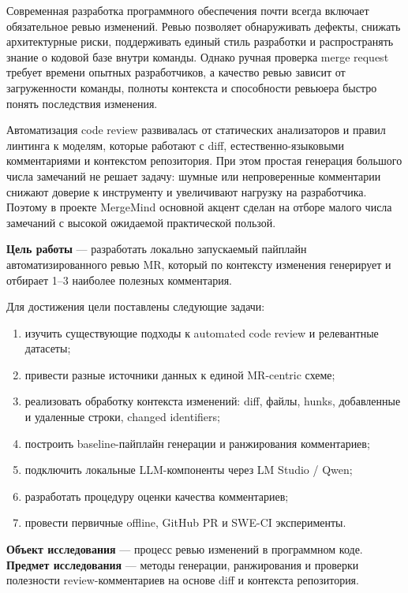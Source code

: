 \documentclass[14pt,a4paper]{extreport}
\begin{document}
Современная разработка программного обеспечения почти всегда включает
обязательное ревью изменений. Ревью позволяет обнаруживать дефекты, снижать
архитектурные риски, поддерживать единый стиль разработки и распространять
знание о кодовой базе внутри команды. Однако ручная проверка merge request
требует времени опытных разработчиков, а качество ревью зависит от загруженности
команды, полноты контекста и способности ревьюера быстро понять последствия
изменения.

Автоматизация code review развивалась от статических анализаторов и правил
линтинга к моделям, которые работают с diff, естественно-языковыми
комментариями и контекстом репозитория. При этом простая генерация большого
числа замечаний не решает задачу: шумные или непроверенные комментарии снижают
доверие к инструменту и увеличивают нагрузку на разработчика. Поэтому в проекте
MergeMind основной акцент сделан на отборе малого числа замечаний с высокой
ожидаемой практической пользой.

\textbf{Цель работы} --- разработать локально запускаемый пайплайн
автоматизированного ревью MR, который по контексту изменения генерирует и
отбирает 1--3 наиболее полезных комментария.

Для достижения цели поставлены следующие задачи:

\begin{enumerate}
  \item изучить существующие подходы к automated code review и релевантные
    датасеты;
  \item привести разные источники данных к единой MR-centric схеме;
  \item реализовать обработку контекста изменений: diff, файлы, hunks,
    добавленные и удаленные строки, changed identifiers;
  \item построить baseline-пайплайн генерации и ранжирования комментариев;
  \item подключить локальные LLM-компоненты через LM Studio / Qwen;
  \item разработать процедуру оценки качества комментариев;
  \item провести первичные offline, GitHub PR и SWE-CI эксперименты.
\end{enumerate}

\textbf{Объект исследования} --- процесс ревью изменений в программном коде.
\textbf{Предмет исследования} --- методы генерации, ранжирования и проверки
полезности review-комментариев на основе diff и контекста репозитория.
\end{document}
